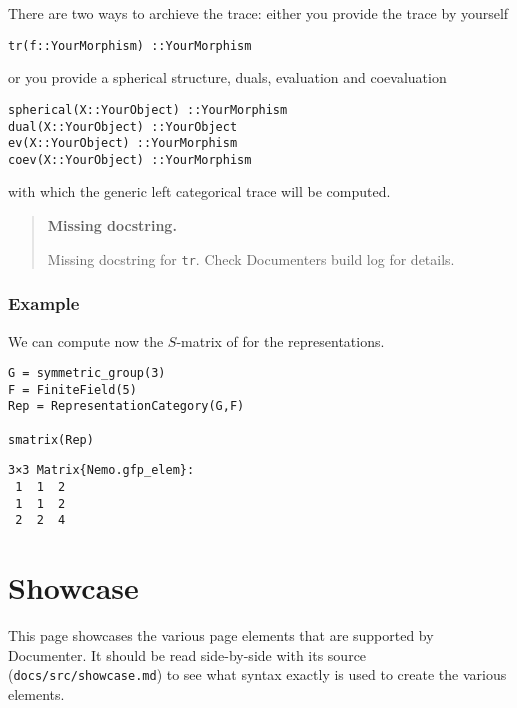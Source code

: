 \documentclass{memoir}
\begin{document}
There are two ways to archieve the trace: either you provide the trace by yourself




\begin{lstlisting}
tr(f::YourMorphism) ::YourMorphism
\end{lstlisting}



or you provide a spherical structure, duals, evaluation and coevaluation




\begin{lstlisting}
spherical(X::YourObject) ::YourMorphism
dual(X::YourObject) ::YourObject
ev(X::YourObject) ::YourMorphism
coev(X::YourObject) ::YourMorphism
\end{lstlisting}



with which the generic left categorical trace will be computed.



\begin{quote}
\textbf{Missing docstring.}

Missing docstring for \texttt{tr}. Check Documenter{\textquotesingle}s build log for details.

\end{quote}


\hypertarget{1764821590549139627}{}


\section{Example}



We can compute now the \(S\)-matrix of for the representations.




\begin{verbatim}
G = symmetric_group(3)
F = FiniteField(5)
Rep = RepresentationCategory(G,F)

smatrix(Rep)
\end{verbatim}


\begin{lstlisting}
3×3 Matrix{Nemo.gfp_elem}:
 1  1  2
 1  1  2
 2  2  4
\end{lstlisting}



\hypertarget{5903134002823049639}{}


\part{Showcase}



This page showcases the various page elements that are supported by Documenter. It should be read side-by-side with its source (\texttt{docs/src/showcase.md}) to see what syntax exactly is used to create the various elements.
\end{document}
